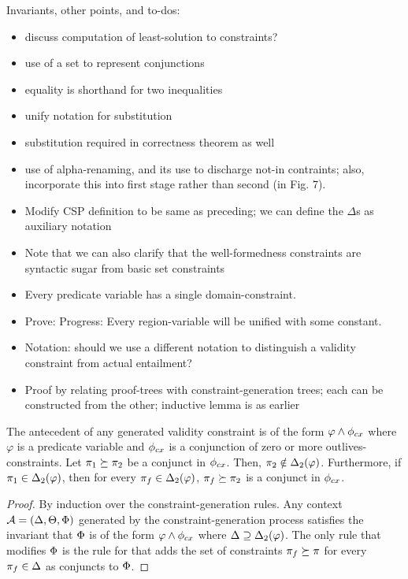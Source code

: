 Invariants, other points, and to-dos:
\begin{itemize}
  \item discuss computation of least-solution to constraints?
  \item use of a set to represent conjunctions
  \item equality is shorthand for two inequalities
  \item unify notation for substitution
  \item substitution required in correctness theorem as well
  \item use of alpha-renaming, and its use to discharge not-in contraints;
also, incorporate this into first stage rather than second (in Fig. 7).
  \item Modify CSP definition to be same as preceding; we can define the $\Delta$s 
    as auxiliary notation
  \item Note that we can also clarify that the well-formedness constraints are
    syntactic sugar from basic set constraints
  \item Every predicate variable has a single domain-constraint.
  \item Prove: Progress: Every region-variable will be unified with some constant.
  \item Notation: should we use a different notation to distinguish a validity constraint
    from actual entailment?
  \item Proof by relating proof-trees with constraint-generation trees; each can
    be constructed from the other; inductive lemma is as earlier
\end{itemize}

\begin{lemma}
The antecedent of any generated validity constraint is of the form
$\varphi \wedge \phi_{cx}$ where $\varphi$ is a predicate variable and
$\phi_{cx}$ is a conjunction of zero or more outlives-constraints.
Let $\pi_1 \succeq \pi_2$ be a conjunct in $\phi_{cx}$.
Then, $\pi_2 \notin {\Delta_2}(\varphi)$.
Furthermore, if $\pi_1 \in {\Delta_2}(\varphi)$, then for
every $\pi_f \in {\Delta_2}(\varphi)$, $\pi_f \succeq \pi_2$ is
a conjunct in $\phi_{cx}$.
\end{lemma}

\begin{proof}
  By induction over the constraint-generation rules.
  Any context ${\mathcal{A}} = (\Delta,\Theta,\Phi)$ generated by the constraint-generation
  process satisfies the invariant that $\Phi$ is of the form $\varphi \wedge \phi_{cx}$
  where $\Delta \supseteq {\Delta_2}(\varphi)$.
  The only rule that modifies $\Phi$ is the rule for 
  that adds the set of constraints $\pi_f \succeq \pi$ for every $\pi_f \in \Delta$
  as conjuncts to $\Phi$.
\end{proof}

